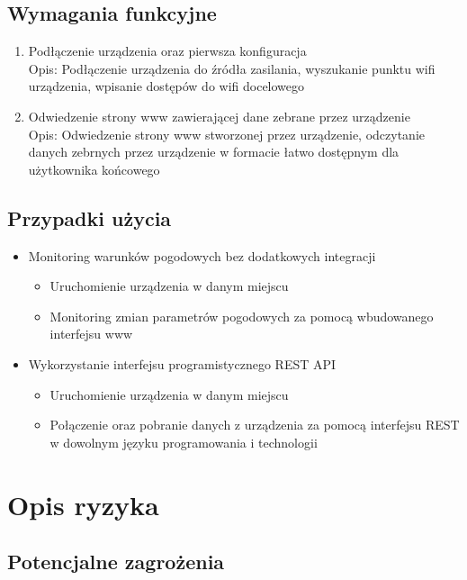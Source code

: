 \documentclass[12pt,a4paper]{article}
\begin{document}
\subsection{Wymagania funkcyjne}

\begin{enumerate}
    \item Podłączenie urządzenia oraz pierwsza konfiguracja\\
    Opis: Podłączenie urządzenia do źródła zasilania, wyszukanie punktu wifi urządzenia, wpisanie dostępów do wifi docelowego
    \item Odwiedzenie strony www zawierającej dane zebrane przez urządzenie\\
    Opis: Odwiedzenie strony www stworzonej przez urządzenie, odczytanie danych zebrnych przez urządzenie w formacie łatwo dostępnym dla
    użytkownika końcowego
\end{enumerate}

\subsection{Przypadki użycia}

\begin{itemize}
    \item Monitoring warunków pogodowych bez dodatkowych integracji
    \begin{itemize}
        \item Uruchomienie urządzenia w danym miejscu
        \item Monitoring zmian parametrów pogodowych za pomocą wbudowanego interfejsu www
    \end{itemize}
    \item Wykorzystanie interfejsu programistycznego REST API
    \begin{itemize}
        \item Uruchomienie urządzenia w danym miejscu
        \item Połączenie oraz pobranie danych z urządzenia za pomocą interfejsu REST w dowolnym języku programowania i technologii
    \end{itemize}
\end{itemize}

\section{Opis ryzyka}

\subsection{Potencjalne zagrożenia}
\end{document}
